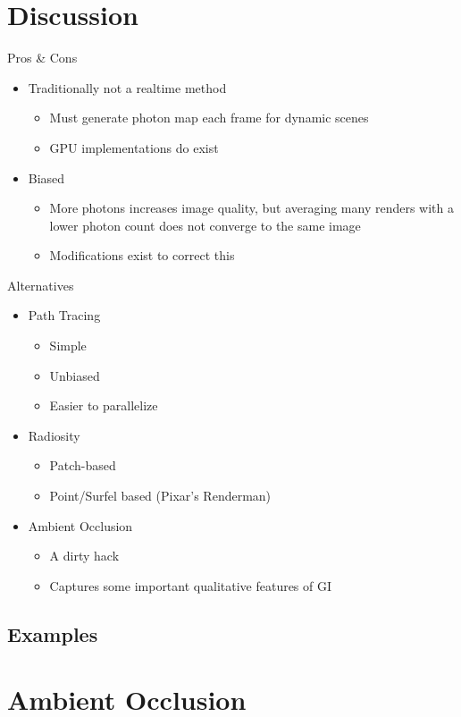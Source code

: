 \documentclass{beamer}
\begin{document}
	\section{Discussion}
		\begin{frame}{Pros \& Cons}
				\begin{itemize}
					\item<2-> Traditionally not a realtime method
						\begin{itemize}
							\item<3-> Must generate photon map each frame for dynamic scenes
							\item<4-> GPU implementations do exist
						\end{itemize}
					\item<5-> Biased
						\begin{itemize}
							\item<6-> More photons increases image quality, but averaging many renders with a lower photon count does not converge to the same image
							\item<7-> Modifications exist to correct this
						\end{itemize}
				\end{itemize}
		\end{frame}

		\begin{frame}{Alternatives}
			\begin{itemize}
				\item<2-> Path Tracing
					\begin{itemize}
						\item<3-> Simple
						\item<4-> Unbiased
						\item<4-> Easier to parallelize
					\end{itemize}
				\item<5-> Radiosity
					\begin{itemize}
						\item<6-> Patch-based
						\item<7-> Point/Surfel based (Pixar's Renderman)
					\end{itemize}
				\item<5-> Ambient Occlusion
					\begin{itemize}
						\item<6-> A dirty hack
						\item<7-> Captures some important qualitative features of GI
					\end{itemize}
			\end{itemize}
		\end{frame}

		\subsection{Examples}

	\section{Ambient Occlusion}
\end{document}
